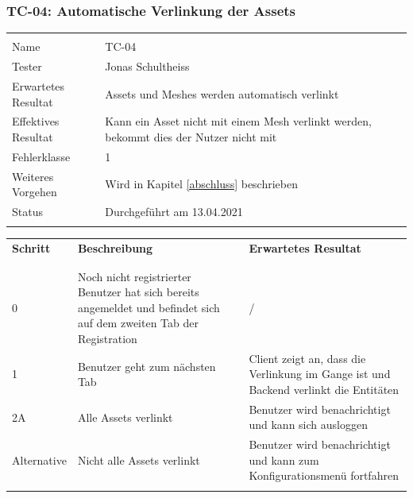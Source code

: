 \subsubsection{TC-04: Automatische Verlinkung der Assets}\label{tc-04}
\begin{table}[H]
  \begin{tabularx}{\textwidth}{l X}\hline \\
  Name & TC-04 \\
  Tester & Jonas Schultheiss \\
  Erwartetes Resultat & Assets und Meshes werden automatisch verlinkt \\
  Effektives Resultat & Kann ein Asset nicht mit einem Mesh verlinkt werden, bekommt dies der Nutzer nicht mit \\
  Fehlerklasse & 1 \\
  Weiteres Vorgehen & Wird in Kapitel \ref{abschluss} beschrieben \\
  Status & Durchgeführt am 13.04.2021 \\
  \\\hline
  \end{tabularx}
\end{table}
\begin{table}[H]
  \begin{tabularx}{\textwidth}{l X X}
  \textbf{Schritt} & \textbf{Beschreibung} & \textbf{Erwartetes Resultat}\\ \\\hline \\
  0 & Noch nicht registrierter Benutzer hat sich bereits angemeldet und befindet sich auf dem zweiten Tab der Registration & / \\
  1 & Benutzer geht zum nächsten Tab & Client zeigt an, dass die Verlinkung im Gange ist und Backend verlinkt die Entitäten \\
  2A & Alle Assets verlinkt & Benutzer wird benachrichtigt und kann sich ausloggen \\
  Alternative & Nicht alle Assets verlinkt & Benutzer wird benachrichtigt und kann zum Konfigurationsmenü fortfahren \\
  \\\hline
  \end{tabularx}
\end{table}
\pagebreak
